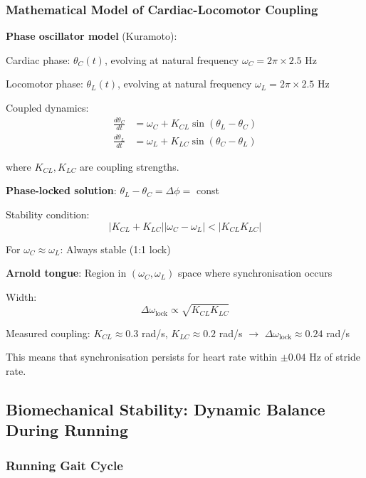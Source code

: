 \documentclass[11pt,onecolumn]{article}
\begin{document}
\subsubsection{Mathematical Model of Cardiac-Locomotor Coupling}

\textbf{Phase oscillator model} (Kuramoto):

Cardiac phase: $\theta_C(t)$, evolving at natural frequency $\omega_C = 2\pi \times 2.5$ Hz

Locomotor phase: $\theta_L(t)$, evolving at natural frequency $\omega_L = 2\pi \times 2.5$ Hz

Coupled dynamics:
\begin{align}
\frac{d\theta_C}{dt} &= \omega_C + K_{CL}\sin(\theta_L - \theta_C) \\
\frac{d\theta_L}{dt} &= \omega_L + K_{LC}\sin(\theta_C - \theta_L)
\end{align}

where $K_{CL}, K_{LC}$ are coupling strengths.

\textbf{Phase-locked solution}: $\theta_L - \theta_C = \Delta\phi = $ const

Stability condition:
\begin{equation}
|K_{CL} + K_{LC}||\omega_C - \omega_L| < |K_{CL}K_{LC}|
\end{equation}

For $\omega_C \approx \omega_L$: Always stable (1:1 lock)

\textbf{Arnold tongue}: Region in $(\omega_C, \omega_L)$ space where synchronisation occurs

Width:
\begin{equation}
\Delta\omega_{\text{lock}} \propto \sqrt{K_{CL}K_{LC}}
\end{equation}

Measured coupling: $K_{CL} \approx 0.3$ rad/s, $K_{LC} \approx 0.2$ rad/s $\to$ $\Delta\omega_{\text{lock}} \approx 0.24$ rad/s

This means that synchronisation persists for heart rate within $\pm 0.04$ Hz of stride rate.

\subsection{Biomechanical Stability: Dynamic Balance During Running}

\subsubsection{Running Gait Cycle}
\end{document}
